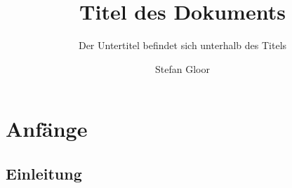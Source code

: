 \documentclass[a4paper]{book} %
\title{Titel des Dokuments}
\subtitle{Der Untertitel befindet sich unterhalb des Titels}
\author{Stefan Gloor}
\begin{document}
 
    \thispagestyle{TitlePageStyle} %
    \maketitle %
    \renewcommand{\cfttoctitlefont}{\sffamily \bfseries \Large}
    \renewcommand{\cftchapfont}{\sffamily \bfseries \large}
    \renewcommand{\cftsecfont}{\sffamily \bfseries}
    \renewcommand{\cftsubsecfont}{\sffamily}
    \renewcommand{\cftsubsubsecfont}{\sffamily}
    \renewcommand{\cftchappagefont}{\sffamily \bfseries \large}
    \renewcommand{\cftsecpagefont}{\sffamily \bfseries}
    \renewcommand{\cftsubsecpagefont}{\sffamily}
    \renewcommand{\cftsubsubsecpagefont}{\sffamily}
    \renewcommand{\cftchapaftersnum}{\bfseries\large.}
    \renewcommand{\cftsecaftersnum}{\bfseries.}
    \renewcommand{\cftsubsecaftersnum}{.}
    \renewcommand{\cftsubsubsecaftersnum}{.}
    \renewcommand{\cftbeforechapskip}{4mm}
    \renewcommand{\cftbeforesecskip}{2mm}
    \renewcommand{\cftbeforesubsecskip}{2mm}
    \renewcommand{\cftbeforesubsubsecskip}{2mm}
    \setlength{\cftbeforetoctitleskip}{0pt}
    \setlength{\cftaftertoctitleskip}{10pt}
    \tableofcontents
    \newpage
    


    \chapter{Anfänge}
         \section{Einleitung}
\end{document}

